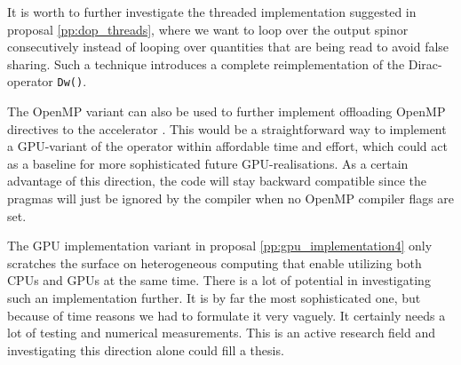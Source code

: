 \documentclass{article}
\theoremstyle{plain} %
\theoremstyle{convention} %
\theoremstyle{remark} %
\def\code#1{\texttt{#1}}
\numberwithin{equation}{section}
\begin{document}
It is worth to further investigate the threaded implementation suggested in proposal \ref{pp:dop_threads}, where we want to loop over the output spinor consecutively instead of looping over quantities that are being read to avoid false sharing. Such a technique introduces a complete reimplementation of the Dirac-operator \code{Dw()}.

The OpenMP variant can also be used to further implement offloading OpenMP directives to the accelerator \cite{omp_offloading}. This would be a straightforward way to implement a GPU-variant of the operator within affordable time and effort, which could act as a baseline for more sophisticated future GPU-realisations. As a certain advantage of this direction, the code will stay backward compatible since the pragmas will just be ignored by the compiler when no OpenMP compiler flags are set.

The GPU implementation variant in proposal \ref{pp:gpu_implementation4} only scratches the surface on heterogeneous computing that enable utilizing both CPUs and GPUs at the same time. There is a lot of potential in investigating such an implementation further. It is by far the most sophisticated one, but because of time reasons we had to formulate it very vaguely. It certainly needs a lot of testing and numerical measurements. This is an active research field and investigating this direction alone could fill a thesis.

\end{document}
